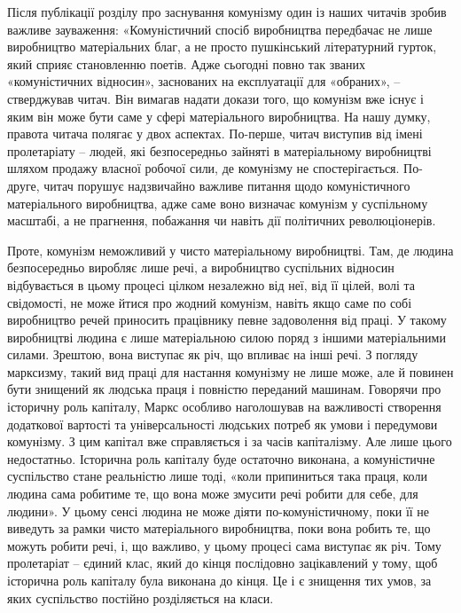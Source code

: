 \documentclass[../main]{subfiles}
\begin{document}
Після публікації розділу про заснування комунізму один із наших читачів зробив важливе зауваження: «Комуністичний спосіб виробництва передбачає не лише виробництво матеріальних благ, а не просто пушкінський літературний гурток, який сприяє становленню поетів. Адже сьогодні повно так званих «комуністичних відносин», заснованих на експлуатації для «обраних», – стверджував читач. Він вимагав надати докази того, що комунізм вже існує і яким він може бути саме у сфері матеріального виробництва. На нашу думку, правота читача полягає у двох аспектах. По-перше, читач виступив від імені пролетаріату – людей, які безпосередньо зайняті в матеріальному виробництві шляхом продажу власної робочої сили, де комунізму не спостерігається. По-друге, читач порушує надзвичайно важливе питання щодо комуністичного матеріального виробництва, адже саме воно визначає комунізм у суспільному масштабі, а не прагнення, побажання чи навіть дії політичних революціонерів.

Проте, комунізм неможливий у чисто матеріальному виробництві. Там, де людина безпосередньо виробляє лише речі, а виробництво суспільних відносин відбувається в цьому процесі цілком незалежно від неї, від її цілей, волі та свідомості, не може йтися про жодний комунізм, навіть якщо саме по собі виробництво речей приносить працівнику певне задоволення від праці. У такому виробництві людина є лише матеріальною силою поряд з іншими матеріальними силами. Зрештою, вона виступає як річ, що впливає на інші речі. З погляду марксизму, такий вид праці для настання комунізму не лише може, але й повинен бути знищений як людська праця і повністю переданий машинам. Говорячи про історичну роль капіталу, Маркс особливо наголошував на важливості створення додаткової вартості та універсальності людських потреб як умови і передумови комунізму. З цим капітал вже справляється і за часів капіталізму. Але лише цього недостатньо. Історична роль капіталу буде остаточно виконана, а комуністичне суспільство стане реальністю лише тоді, «коли припиниться така праця, коли людина сама робитиме те, що вона може змусити речі робити для себе, для людини». У цьому сенсі людина не може діяти по-комуністичному, поки її не виведуть за рамки чисто матеріального виробництва, поки вона робить те, що можуть робити речі, і, що важливо, у цьому процесі сама виступає як річ. Тому пролетаріат – єдиний клас, який до кінця послідовно зацікавлений у тому, щоб історична роль капіталу була виконана до кінця. Це і є знищення тих умов, за яких суспільство постійно розділяється на класи.
\end{document}
